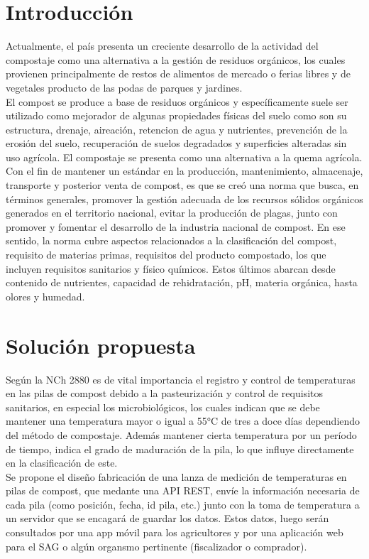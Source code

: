\documentclass[12pt, letterpaper]{article}
\begin{document}
\section{Introducción}
Actualmente, el país presenta un creciente desarrollo de la actividad del compostaje como una alternativa a la gestión de residuos orgánicos, los cuales provienen principalmente de restos de alimentos de mercado o ferias libres y de vegetales producto de las podas de parques y jardines. \\
El compost se produce a base de residuos orgánicos y específicamente suele ser utilizado como mejorador de algunas propiedades físicas del suelo como son su estructura, drenaje, aireación, retencion de agua y nutrientes, prevención de la erosión del suelo, recuperación de suelos degradados y superficies alteradas sin uso agrícola. El compostaje se presenta como una alternativa a la quema agrícola.\\
Con el fin de mantener un estándar en la producción, mantenimiento, almacenaje, transporte y posterior venta de compost, es que se creó una norma que busca, en términos generales, promover la gestión adecuada de los recursos sólidos orgánicos generados en el territorio nacional, evitar la producción de plagas, junto con promover y fomentar el desarrollo de la industria nacional de compost. En ese sentido, la norma cubre aspectos relacionados a la clasificación del compost, requisito de materias primas, requisitos del producto compostado, los que incluyen requisitos sanitarios y físico químicos. Estos últimos abarcan desde contenido de nutrientes, capacidad de rehidratación, pH, materia orgánica, hasta olores y humedad.\\
\section{Solución propuesta}
Según la NCh 2880 es de vital importancia el registro y control de temperaturas en las pilas de compost debido a la pasteurización y control de requisitos sanitarios, en especial los microbiológicos, los cuales indican que se debe mantener una temperatura mayor o igual a 55°C de tres a doce días dependiendo del método de compostaje. Además mantener cierta temperatura por un período de tiempo, indica el grado de maduración de la pila, lo que influye directamente en la clasificación de este. \\
Se propone el diseño  fabricación de una lanza de medición de temperaturas en pilas de compost, que medante una API REST, envíe la información necesaria de cada pila (como posición, fecha, id pila, etc.) junto con la toma de temperatura a un servidor que se encagará de guardar los datos. Estos datos, luego serán consultados por una app móvil para los agricultores y por una aplicación web para el SAG o algún organsmo pertinente (fiscalizador o comprador).
\end{document}
